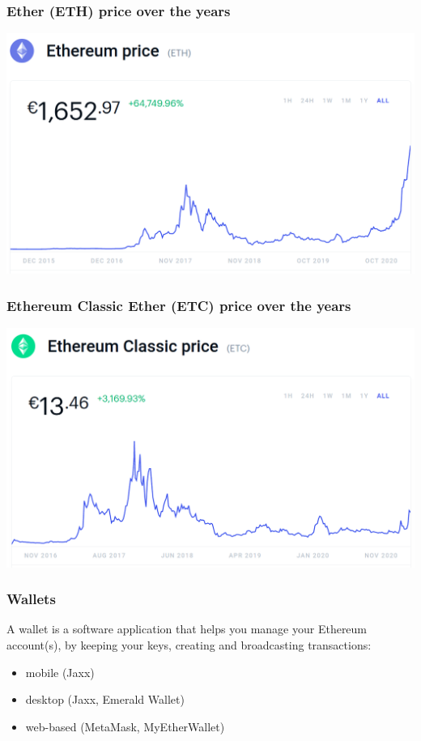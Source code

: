 \documentclass[11pt]{beamer}  %
\begin{document}
\begin{frame}\frametitle{Ether (ETH) price over the years}

  \begin{center}
    \includegraphics[scale=0.29,clip=false]{pictures/ether-chart.png}
  \end{center}

\end{frame}

\begin{frame}\frametitle{Ethereum Classic Ether (ETC) price over the years}

  \begin{center}
    \includegraphics[scale=0.29,clip=false]{pictures/ether-classic-chart.png}
  \end{center}

\end{frame}


\begin{frame}\frametitle{Wallets}

  \begin{greenbox}{}
    A wallet is a
    software application that helps you manage your Ethereum account(s),
    by keeping your keys, creating and broadcasting transactions:
    \begin{itemize}
    \item mobile (Jaxx)
    \item desktop (Jaxx, Emerald Wallet)
    \item web-based (MetaMask, MyEtherWallet)
    \end{itemize}
  \end{greenbox}

\end{frame}
\end{document}
